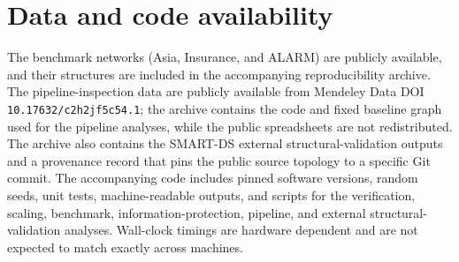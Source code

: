 \section*{Data and code availability}
The benchmark networks (Asia, Insurance, and ALARM) are publicly available,
and their structures are included in the accompanying reproducibility archive.
The pipeline-inspection data are publicly available from Mendeley Data DOI
\texttt{10.17632/c2h2jf5c54.1}; the archive contains the code and fixed baseline
graph used for the pipeline analyses, while the public spreadsheets are not
redistributed. The archive also contains the SMART-DS external structural-validation
outputs and a provenance record that pins the public source topology to a specific
Git commit. The accompanying code includes pinned software versions, random seeds,
unit tests, machine-readable outputs, and scripts for the verification, scaling,
benchmark, information-protection, pipeline, and external structural-validation
analyses. Wall-clock timings are hardware dependent and are not expected to match
exactly across machines.
